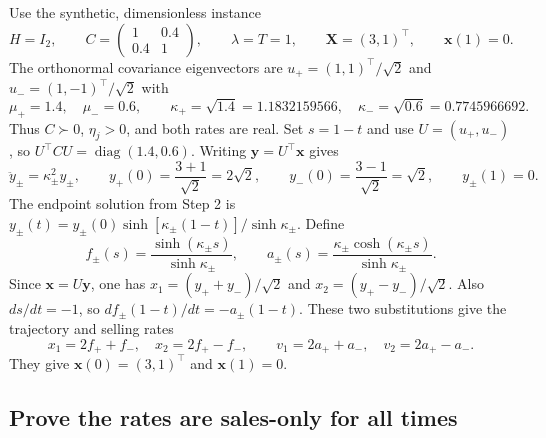 Use the synthetic, dimensionless instance
\[
 H=I_2,\qquad C=\begin{pmatrix}1&0.4\\0.4&1\end{pmatrix},\qquad
 \lambda=T=1,\qquad\mathbf X=(3,1)^\top,\qquad\mathbf x(1)=0.
\]
The orthonormal covariance eigenvectors are
$u_+=(1,1)^\top/\sqrt2$ and $u_-=(1,-1)^\top/\sqrt2$ with
\[
 \mu_+=1.4,\quad\mu_-=0.6,\qquad
 \kappa_+=\sqrt{1.4}=1.1832159566,\quad
 \kappa_-=\sqrt{0.6}=0.7745966692.
\]
Thus $C\succ0$, $\eta_j>0$, and both rates are real. Set $s=1-t$ and
use $U=(u_+,u_-)$, so $U^\top C U=\operatorname{diag}(1.4,0.6)$.
Writing $\mathbf y=U^\top\mathbf x$ gives
\[
 \ddot y_\pm=\kappa_\pm^2y_\pm,\qquad
 y_+(0)=\frac{3+1}{\sqrt2}=2\sqrt2,\qquad
 y_-(0)=\frac{3-1}{\sqrt2}=\sqrt2,\qquad y_\pm(1)=0.
\]
The endpoint solution from Step 2 is
$y_\pm(t)=y_\pm(0)\sinh[\kappa_\pm(1-t)]/\sinh\kappa_\pm$.
Define
\[
 f_\pm(s)=\frac{\sinh(\kappa_\pm s)}{\sinh\kappa_\pm},\qquad
 a_\pm(s)=\frac{\kappa_\pm\cosh(\kappa_\pm s)}{\sinh\kappa_\pm}.
\]
Since $\mathbf x=U\mathbf y$, one has
$x_1=(y_++y_-)/\sqrt2$ and $x_2=(y_+-y_-)/\sqrt2$.
Also $ds/dt=-1$, so $df_\pm(1-t)/dt=-a_\pm(1-t)$.
These two substitutions give the trajectory and selling rates
\begin{equation}
 x_1=2f_++f_-,\quad x_2=2f_+-f_-,\qquad
 v_1=2a_++a_-,\quad v_2=2a_+-a_-.
 \label{eq:stage3-rates}
\end{equation}
They give $\mathbf x(0)=(3,1)^\top$ and $\mathbf x(1)=0$.

\subsection*{Prove the rates are sales-only for all times}

